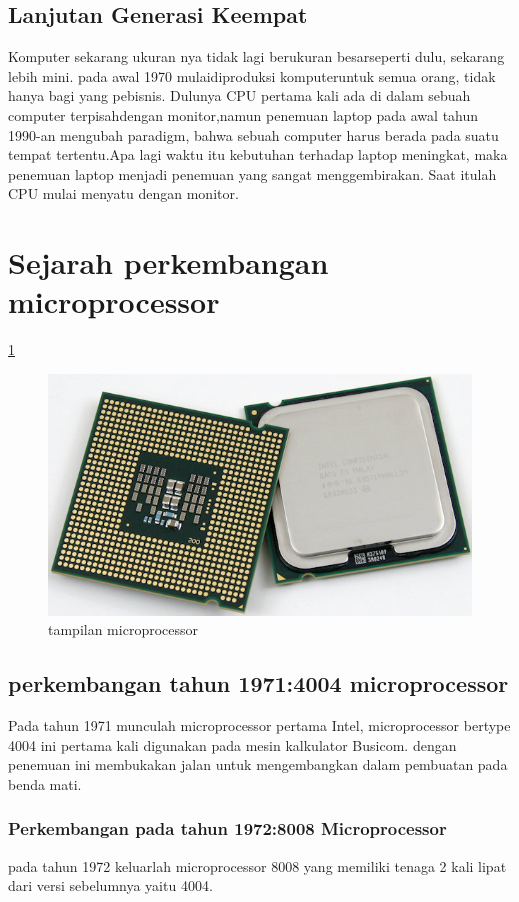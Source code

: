 	\subsection{Lanjutan Generasi Keempat}
 Komputer sekarang ukuran nya tidak lagi berukuran besarseperti dulu, sekarang lebih mini. pada awal 1970 mulaidiproduksi komputeruntuk semua orang, tidak hanya bagi yang pebisnis.
 Dulunya CPU pertama kali ada di dalam sebuah computer terpisahdengan monitor,namun penemuan laptop pada awal tahun 1990-an mengubah paradigm, bahwa sebuah computer harus berada pada suatu tempat tertentu.Apa lagi waktu itu kebutuhan terhadap laptop meningkat, maka penemuan laptop menjadi penemuan yang sangat menggembirakan. Saat itulah CPU mulai menyatu dengan monitor.


 \section{Sejarah perkembangan microprocessor}
 	\ref{microprocessor}


 	\begin{figure}[ht]
\centerline{\includegraphics[width=1\textwidth]{figures/microprocessor}}
\caption{tampilan microprocessor}
\label{microprocessor}
\end{figure}
 			\subsection{perkembangan tahun 1971:4004 microprocessor}
 	Pada tahun 1971 munculah microprocessor pertama Intel, microprocessor bertype 4004 ini pertama kali digunakan pada mesin kalkulator Busicom. dengan penemuan ini membukakan jalan untuk mengembangkan dalam pembuatan pada benda mati.
 			\subsubsection{Perkembangan pada tahun 1972:8008 Microprocessor}
 	pada tahun 1972 keluarlah microprocessor 8008 yang memiliki tenaga 2 kali lipat dari versi sebelumnya yaitu 4004.

